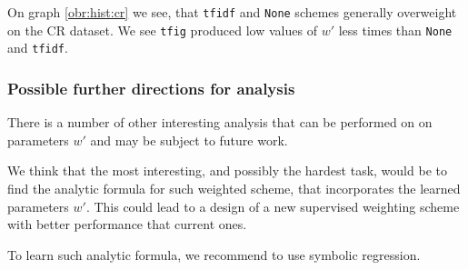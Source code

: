     On graph \ref{obr:hist:cr} we see, that \texttt{tfidf} and \texttt{None} schemes generally overweight on the CR dataset.
    We see \texttt{tfig} produced low values of $w'$ less times than \texttt{None} and \texttt{tfidf}.
    
    \subsubsection{Possible further directions for analysis}
    
    There is a number of other interesting analysis that can be performed on on parameters $w'$ and may be subject to future work.
    
    We think that the most interesting, and possibly the hardest task, would be to find the analytic formula for such weighted scheme, that incorporates the learned parameters $w'$. 
    This could lead to a design of a new supervised weighting scheme with better performance that current ones.
    
    To learn such analytic formula, we recommend to use symbolic regression.
